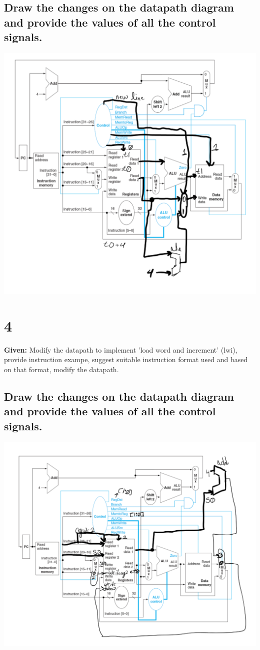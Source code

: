 \documentclass{article}
\begin{document}
\subsection{Draw the changes on the datapath diagram and provide the values of all the control signals.}
\includegraphics[width=\textwidth]{q3.png}


\section{4}
\textbf{Given:} Modify the datapath to implement 'load word and increment' (lwi), provide instruction exampe, suggest suitable instruction format used and based on that format, modify the datapath.

\subsection{Draw the changes on the datapath diagram and provide the values of all the control signals.}
\includegraphics[width=\textwidth]{q4.png}
\end{document}
